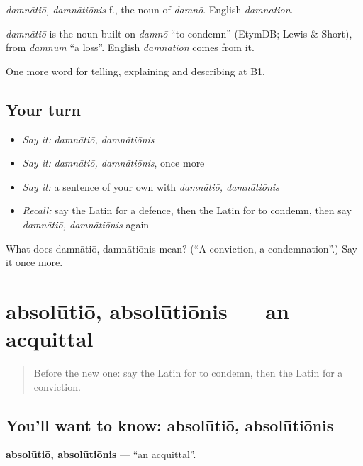 \emph{damnātiō, damnātiōnis} f., the noun of \emph{damnō}. English \emph{damnation}.

\begin{cousinweb}
\emph{damnātiō} is the noun built on \emph{damnō} \textquotedblleft{}to condemn\textquotedblright{} (EtymDB; Lewis \& Short), from \emph{damnum} \textquotedblleft{}a loss\textquotedblright{}. English \emph{damnation} comes from it.
\end{cousinweb}

\begin{grammarlens}[title={What you've built}]
One more word for telling, explaining and describing at B1.
\end{grammarlens}

\subsection*{Your turn}
\begin{itemize}
\raggedright
  \item \emph{Say it:} \emph{damnātiō, damnātiōnis}
  \item \emph{Say it:} \emph{damnātiō, damnātiōnis}, once more
  \item \emph{Say it:} a sentence of your own with \emph{damnātiō, damnātiōnis}
  \item \emph{Recall:} say the Latin for a defence, then the Latin for to condemn, then say \emph{damnātiō, damnātiōnis} again
\end{itemize}

\begin{tcolorbox}[breakable,colback=teal!4,colframe=teal!35!black,title={Before you move on}]
What does damnātiō, damnātiōnis mean? (\textquotedblleft{}A conviction, a condemnation\textquotedblright{}.) Say it once more.
\end{tcolorbox}
\section[absolūtiō, absolūtiōnis]{absolūtiō, absolūtiōnis — an acquittal}

\label{lesson:LA-C413-absolutio}



\begin{quote}
Before the new one: say the Latin for to condemn, then the Latin for a conviction.
\end{quote}

\subsection*{You'll want to know: absolūtiō, absolūtiōnis}
\textbf{absolūtiō, absolūtiōnis} — \textquotedblleft{}an acquittal\textquotedblright{}.

